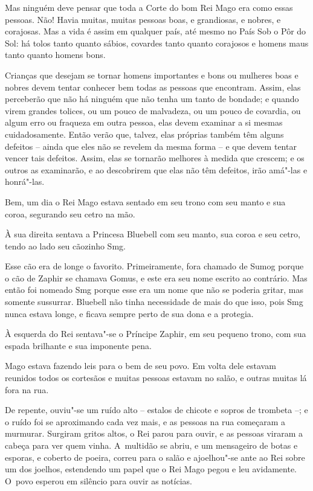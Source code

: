 Mas ninguém deve pensar que toda a Corte do bom Rei Mago era como essas
pessoas. Não! Havia muitas, muitas pessoas boas, e grandiosas, e nobres,
e corajosas. Mas a vida é assim em qualquer país, até mesmo no País Sob
o Pôr do Sol: há tolos tanto quanto sábios, covardes tanto quanto
corajosos e homens maus tanto quanto homens bons.

Crianças que desejam se tornar homens importantes e bons ou mulheres
boas e nobres devem tentar conhecer bem todas as pessoas que encontram.
Assim, elas perceberão que não há ninguém que não tenha um tanto de
bondade; e quando virem grandes tolices, ou um pouco de malvadeza, ou um
pouco de covardia, ou algum erro ou fraqueza em outra pessoa, elas devem
examinar a si mesmas cuidadosamente. Então verão que, talvez, elas
próprias também têm alguns defeitos -- ainda que eles não se revelem da
mesma forma -- e que devem tentar vencer tais defeitos. Assim, elas se
tornarão melhores à medida que crescem; e os outros as examinarão, e ao
descobrirem que elas não têm defeitos, irão amá"-las e honrá"-las.

Bem, um dia o Rei Mago estava sentado em seu trono com seu manto e sua
coroa, segurando seu cetro na mão.

À sua direita sentava a Princesa Bluebell com seu manto, sua coroa e seu
cetro, tendo ao lado seu cãozinho Smg.

Esse cão era de longe o favorito. Primeiramente, fora chamado de Sumog
porque o cão de Zaphir se chamava Gomus, e este era seu nome escrito ao
contrário. Mas então foi nomeado Smg porque esse era um nome que não se
poderia gritar, mas somente sussurrar. Bluebell não tinha necessidade de
mais do que isso, pois Smg nunca estava longe, e ficava sempre perto de
sua dona e a protegia.

À esquerda do Rei sentava"-se o Príncipe Zaphir, em seu pequeno trono,
com sua espada brilhante e sua imponente pena.

Mago estava fazendo leis para o bem de seu povo. Em volta dele estavam
reunidos todos os cortesãos e muitas pessoas estavam no salão, e outras
muitas lá fora na rua.

De repente, ouviu"-se um ruído alto -- estalos de chicote e sopros de
trombeta --; e o ruído foi se aproximando cada vez mais, e as pessoas na
rua começaram a murmurar. Surgiram gritos altos, o Rei parou para ouvir,
e as pessoas viraram a cabeça para ver quem vinha. A~multidão se abriu,
e um mensageiro de botas e esporas, e coberto de poeira, correu para o
salão e ajoelhou"-se ante ao Rei sobre um dos joelhos, estendendo um
papel que o Rei Mago pegou e leu avidamente. O~povo esperou em silêncio
para ouvir as notícias.


